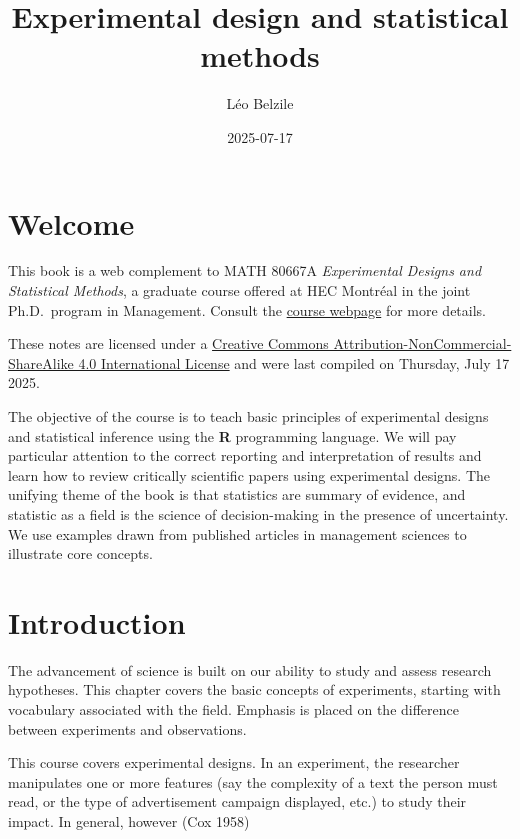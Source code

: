 \documentclass[
  11pt,
  letterpaper,
]{scrbook}
\title{Experimental design and statistical methods}
\author{Léo Belzile}
\date{2025-07-17}
\renewcommand*\contentsname{Table of contents}
\newcommand\contentsname{Table of contents}
\theoremstyle{definition}
\theoremstyle{definition}
\theoremstyle{remark}
\begin{document}


\renewcommand*\contentsname{Table of contents}
{
\setcounter{tocdepth}{2}
\tableofcontents
}

\mainmatter
{}

\chapter*{Welcome}\label{welcome}


This book is a web complement to MATH 80667A \emph{Experimental Designs
and Statistical Methods}, a graduate course offered at HEC Montréal in
the joint Ph.D.~program in Management. Consult the
\href{https://lbelzile.github.io/experimental}{course webpage} for more
details.

These notes are licensed under a
\href{http://creativecommons.org/licenses/by-nc-sa/4.0/}{Creative
Commons Attribution-NonCommercial-ShareAlike 4.0 International License}
and were last compiled on Thursday, July 17 2025.

The objective of the course is to teach basic principles of experimental
designs and statistical inference using the \textbf{R} programming
language. We will pay particular attention to the correct reporting and
interpretation of results and learn how to review critically scientific
papers using experimental designs. The unifying theme of the book is
that statistics are summary of evidence, and statistic as a field is the
science of decision-making in the presence of uncertainty. We use
examples drawn from published articles in management sciences to
illustrate core concepts.


\chapter{Introduction}\label{introduction}

The advancement of science is built on our ability to study and assess
research hypotheses. This chapter covers the basic concepts of
experiments, starting with vocabulary associated with the field.
Emphasis is placed on the difference between experiments and
observations.

This course covers experimental designs. In an experiment, the
researcher manipulates one or more features (say the complexity of a
text the person must read, or the type of advertisement campaign
displayed, etc.) to study their impact. In general, however (Cox 1958)
\end{document}
